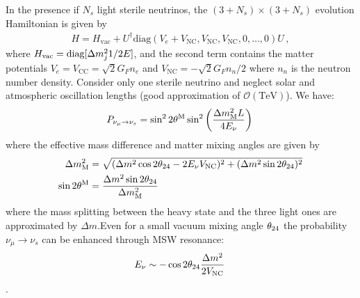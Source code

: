\documentclass[twocolumn]{article}
\newcommand{\nms}{\ensuremath{\nu_\mu \to \nu_s}}
\renewcommand{\th}[1][]{%
  \theta\ifx\\#1\\\else_\text{#1}\fi
}
\newcommand{\thm}[1][]{%
  \theta^\text{M}\ifx\\#1\\\else_\text{#1}\fi
}
\renewcommand{\t}[1]{\ensuremath{\text{{#1}}}}
\newcommand*{\dm}[1][]{%
  \Delta m^2\ifx\\#1\\\else_\text{#1}\fi
}
\begin{document}
In the presence if $N_s$ light sterile neutrinos, the $(3+N_s)\times(3+N_s)$ evolution Hamiltonian is given by
\begin{align*}
  H = H_\t{vac} + U^\dagger \t{diag}(V_e + V_\t{NC}, V_\t{NC}, V_\t{NC}, 0, \ldots, 0)U
\,,\end{align*}
where $H_\t{vac} = \t{diag}[\dm_j1/2E]$, and the second term contains the matter potentials $V_e = V_\t{CC} = \sqrt{2}G_F n_e$ and $V_\t{NC} = -\sqrt{2}G_F n_n/2$ where $n_n$ is the neutron number density. Consider only one sterile neutrino and neglect solar and atmospheric oscillation lengths (good approximation of $\mathcal{O}(\t{TeV})$). We have:
\begin{align*}
  P_{\nms} = \sin^2 2\thm \sin^2 \left( \frac{\dm[M] L}{4E_\nu} \right) 
\,\end{align*}
where the effective mass difference and matter mixing angles are given by
\begin{align*}
  \dm[M] &= \sqrt{(\dm \cos 2\th[24] - 2E_\nu V_\t{NC})^2 + (\dm \sin 2\th[24])^2}\\
  \sin 2\thm &= \frac{\dm \sin 2\th[24]}{\dm[M]}
\,\end{align*}
where the mass splitting between the heavy state and the three light ones are approximated by $\Delta m$.Even for a small vacuum mixing angle $\th[24]$ the probability $\nms$ can be enhanced through MSW resonance:
\begin{align*}
  E_\nu \sim - \cos 2\th[24] \frac{\dm}{2 V_\t{NC}}
\,\end{align*}.
\end{document}
